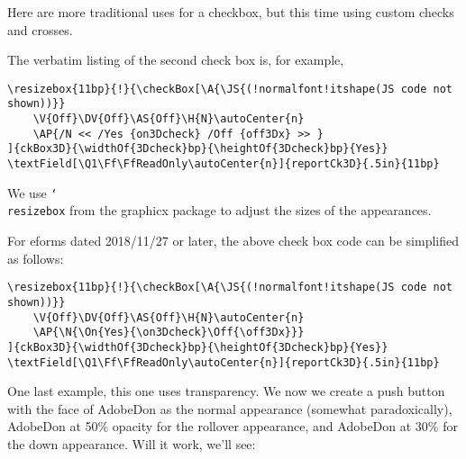 \documentclass{article}
\newcommand{\cs}[1]{\texttt{\char`\\#1}}
\let\pkg\textsf
\begin{document}
Here are more traditional uses for a checkbox, but this time using
custom checks and crosses.\bigskip

\noindent\hspace*{20pt}
\cgBdry[6pt]
\medskip 

The verbatim listing of the second check box is, for example,
\begin{Verbatim}[fontsize=\small,commandchars=!()]
\resizebox{11bp}{!}{\checkBox[\A{\JS{(!normalfont!itshape(JS code not shown))}}
    \V{Off}\DV{Off}\AS{Off}\H{N}\autoCenter{n}
    \AP{/N << /Yes {on3Dcheck} /Off {off3Dx} >> }
]{ckBox3D}{\widthOf{3Dcheck}bp}{\heightOf{3Dcheck}bp}{Yes}}
\textField[\Q1\Ff\FfReadOnly\autoCenter{n}]{reportCk3D}{.5in}{11bp}
\end{Verbatim}
We use \cs{resizebox} from the \textsf{graphicx} package to adjust
the sizes of the appearances.\medskip

For \pkg{eforms} dated 2018/11/27 or later, the above check box code can be simplified
as follows:
\begin{Verbatim}[fontsize=\small,commandchars=!()]
\resizebox{11bp}{!}{\checkBox[\A{\JS{(!normalfont!itshape(JS code not shown))}}
    \V{Off}\DV{Off}\AS{Off}\H{N}\autoCenter{n}
    \AP{\N{\On{Yes}{\on3Dcheck}\Off{\off3Dx}}}
]{ckBox3D}{\widthOf{3Dcheck}bp}{\heightOf{3Dcheck}bp}{Yes}}
\textField[\Q1\Ff\FfReadOnly\autoCenter{n}]{reportCk3D}{.5in}{11bp}
\end{Verbatim}
\newpage


One last example, this one uses transparency. We now we create a push
button with the face of AdobeDon as the normal appearance (somewhat
paradoxically), AdobeDon at 50\% opacity for the rollover
appearance, and AdobeDon at 30\% for the down appearance. Will it
work, we'll see:\medskip
\end{document}
